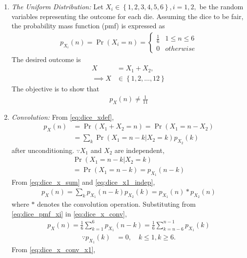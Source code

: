 \documentclass[journal,8pt,onecolumn]{IEEEtran}
\providecommand{\pr}[1]{\ensuremath{\Pr\left(#1\right)}}
\providecommand{\cbrak}[1]{\ensuremath{\left\{#1\right\}}}
\begin{document}
\begin{enumerate}
\item  {\em The Uniform Distribution: }Let $X_i \in \cbrak{1,2,3,4,5,6}, i = 1,2,$ be the random variables representing the outcome for each die.  Assuming the dice to be fair, the probability mass function (pmf) is expressed as 
\begin{align}
\label{eq:dice_pmf_xi}
p_{X_i}(n) = \pr{X_i = n} = 
\begin{cases}
\frac{1}{6} & 1 \le n \le 6
\\
0 & otherwise
\end{cases}
\end{align}
The desired outcome is
\begin{align}
\label{eq:dice_xdef}
X &= X_1 + X_2,
\\
\implies X &\in \cbrak{1,2,\dots,12}
\end{align}
%
The objective is to show that
\begin{align}
p_X(n) \ne \frac{1}{11}
\label{eq:dice_wrong}
\end{align}
\item {\em Convolution: }
From \eqref{eq:dice_xdef},
\begin{align}
p_X(n) &= \pr{X_1 + X_2 = n} = \pr{X_1  = n -X_2}
\\
&= \sum_{k}^{}\pr{X_1  = n -k | X_2 = k}p_{X_2}(k)
\label{eq:dice_x_sum}
\end{align}%
after unconditioning.  $\because X_1$ and $X_2$ are independent,
\begin{multline}
\pr{X_1  = n -k | X_2 = k} 
\\
= \pr{X_1  = n -k} = p_{X_1}(n-k)
\label{eq:dice_x1_indep}
\end{multline}
From \eqref{eq:dice_x_sum} and \eqref{eq:dice_x1_indep},
\begin{align}
p_X(n) = \sum_{k}^{}p_{X_1}(n-k)p_{X_2}(k) = p_{X_1}(n)*p_{X_2}(n)
\label{eq:dice_x_conv}
\end{align}
where $*$ denotes the convolution operation. 
Substituting from \eqref{eq:dice_pmf_xi}
in \eqref{eq:dice_x_conv},
\begin{align}
p_X(n) = \frac{1}{6}\sum_{k=1}^{6}p_{X_1}(n-k)= \frac{1}{6}\sum_{k=n-6}^{n-1}p_{X_1}(k)
\label{eq:dice_x_conv_x1}
\end{align}
\begin{align}
\because p_{X_1}(k) &= 0, \quad k \le 1, k \ge 6.
\end{align}
From \eqref{eq:dice_x_conv_x1},
%
\begin{align}

\end{align}
\end{enumerate}
\end{document}
